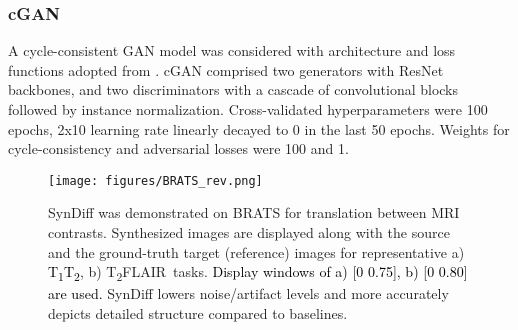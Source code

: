 \documentclass[journal,twoside,web]{ieeecolor}
\newcommand{\ToneTtwo}{T\textsubscript{1}T\textsubscript{2}}
\newcommand{\TtwoFlair}{T\textsubscript{2}FLAIR}
\newcommand*{\revhl}{\textcolor{black}}
\begin{document}
\subsubsection{cGAN}
A cycle-consistent GAN model was considered with architecture and loss functions adopted from \cite{dar2019image}. cGAN comprised two generators with ResNet backbones, and two discriminators with a cascade of convolutional blocks followed by instance normalization. Cross-validated hyperparameters were 100 epochs, 2x10 learning rate linearly decayed to 0 in the last 50 epochs. Weights for cycle-consistency and adversarial losses were 100 and 1.


 \begin{figure*}[t]
 \centering
 \texttt{[image: figures/BRATS\_rev.png]}
 \caption{SynDiff was demonstrated on BRATS for translation between MRI contrasts. Synthesized images are displayed along with the source and the ground-truth target (reference) images for representative a) \revhl{\ToneTtwo}, b) \TtwoFlair~tasks. \revhl{Display windows of a) [0 0.75], b) [0 0.80] are used.} SynDiff lowers noise/artifact levels and more accurately depicts detailed structure compared to baselines.}
 \label{fig:BRATS}
 \end{figure*}
\end{document}
